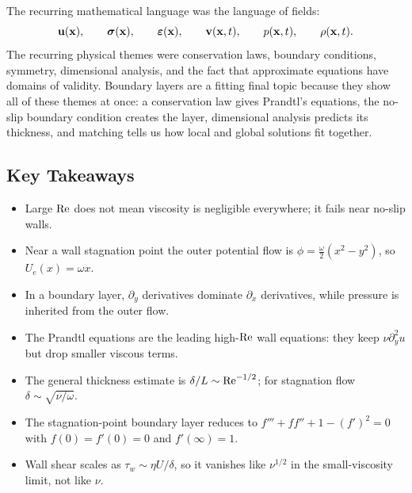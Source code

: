 \documentclass[../main.tex]{subfiles}
\begin{document}
The recurring mathematical language was the language of fields:
\[
  \mathbf{u}(\mathbf{x}),\qquad \boldsymbol{\sigma}(\mathbf{x}),\qquad \boldsymbol{\varepsilon}(\mathbf{x}),\qquad
  \mathbf{v}(\mathbf{x},t),\qquad p(\mathbf{x},t),\qquad \rho(\mathbf{x},t).
\]
The recurring physical themes were conservation laws, boundary conditions,
symmetry, dimensional analysis, and the fact that approximate equations have
domains of validity.  Boundary layers are a fitting final topic because they
show all of these themes at once: a conservation law gives Prandtl's equations,
the no-slip boundary condition creates the layer, dimensional analysis predicts
its thickness, and matching tells us how local and global solutions fit
together.

\subsection*{Key Takeaways}
\begin{itemize}
  \item Large $\mathrm{Re}$ does not mean viscosity is negligible everywhere; it
  fails near no-slip walls.
  \item Near a wall stagnation point the outer potential flow is
  $\phi=\frac{\omega}{2}(x^2-y^2)$, so $U_e(x)=\omega x$.
  \item In a boundary layer, $\partial_y$ derivatives dominate
  $\partial_x$ derivatives, while pressure is inherited from the outer flow.
  \item The Prandtl equations are the leading high-$\mathrm{Re}$ wall equations:
  they keep $\nu\partial_y^2u$ but drop smaller viscous terms.
  \item The general thickness estimate is
  $\delta/L\sim\mathrm{Re}^{-1/2}$; for stagnation flow
  $\delta\sim\sqrt{\nu/\omega}$.
  \item The stagnation-point boundary layer reduces to
  $f'''+f f''+1-(f')^2=0$ with
  $f(0)=f'(0)=0$ and $f'(\infty)=1$.
  \item Wall shear scales as $\tau_w\sim\eta U/\delta$, so it vanishes like
  $\nu^{1/2}$ in the small-viscosity limit, not like $\nu$.
\end{itemize}
\end{document}
